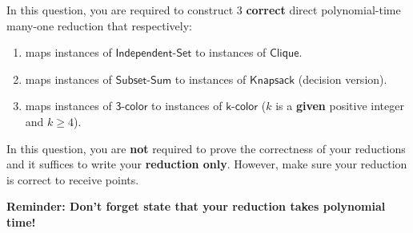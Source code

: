 
In this question, you are required to construct 3 \textbf{correct} {\color{blue} direct} {\color{red} polynomial-time many-one reduction} that respectively:
\begin{enumerate}
    \item maps instances of $\mathsf{Independent \text{-} Set}$ to instances of $\mathsf{Clique}$.
    \item maps instances of $\mathsf{Subset \text{-} Sum}$ to instances of $\mathsf{Knapsack}$ (decision version).
    \item maps instances of $\mathsf{3 \text{-} color}$ to instances of $\mathsf{k \text{-} color}$ ($k$ is a \textbf{given} positive integer and $k \geq 4$).
\end{enumerate}
In this question, you are \textbf{not} required to prove the correctness of your reductions and it suffices to write your \textbf{reduction only}. However, make sure your reduction is correct to receive points.

\textbf{\color{red} Reminder: Don't forget state that your reduction takes polynomial time!}

